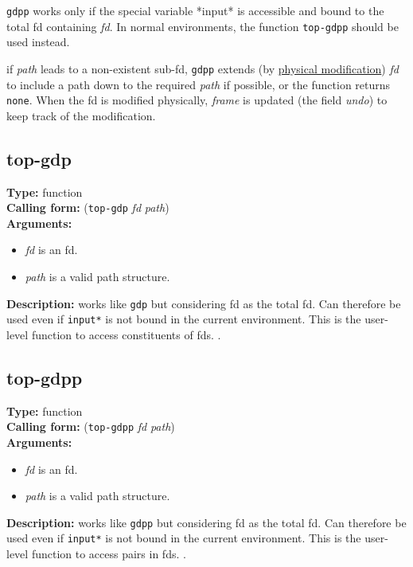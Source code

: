 \documentclass[10pt,a4paper]{report}
\begin{document}
{\tt gdpp} works only if the special variable *input* is accessible
and bound to the total fd containing {\em fd}.  
In normal environments, the function {\tt top-gdpp} should be used
instead.

if {\em path} leads to a non-existent sub-fd, {\tt gdpp} extends (by
\underline{physical modification}) {\em fd} to include a path down to the
required {\em path} if possible, or the function returns {\tt none}.
When the fd is modified physically, {\em frame} is updated (the field
{\em undo}) to keep track of the modification.

\subsection{top-gdp}
{\bf Type:} function
\\{\bf Calling form:} ({\tt top-gdp} {\em fd} {\em path})
\\{\bf Arguments:}
\begin{itemize}
\item {\em fd} is an fd. 

\item {\em path} is a valid path structure.
\end{itemize}
{\bf Description:} works like {\tt gdp} but considering fd as the total fd.
Can therefore be used even if {\tt *input*} is not bound in the current
environment. This is the user-level function to access constituents of fds.
.

\subsection{top-gdpp}
{\bf Type:} function
\\{\bf Calling form:} ({\tt top-gdpp} {\em fd} {\em path})
\\{\bf Arguments:}
\begin{itemize}
\item {\em fd} is an fd. 

\item {\em path} is a valid path structure.
\end{itemize}
{\bf Description:} works like {\tt gdpp} but considering fd as the total fd.
Can therefore be used even if {\tt *input*} is not bound in the current
environment. This is the user-level function to access pairs in fds.
.
\end{document}

